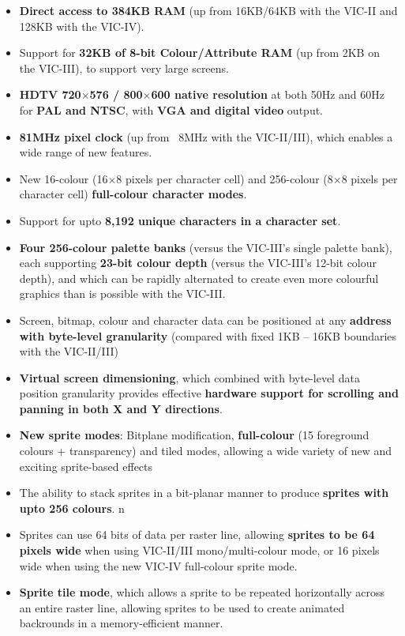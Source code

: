 \begin{itemize}
\item {\bf Direct access to 384KB RAM} (up from 16KB/64KB with the VIC-II and 128KB
  with the VIC-IV).
\item Support for {\bf 32KB of 8-bit Colour/Attribute RAM} (up from 2KB on the VIC-III), to
  support very large screens.
\item {\bf HDTV 720$\times$576 / 800$\times$600 native resolution} at both 50Hz and 60Hz for {\bf PAL and NTSC}, with {\bf VGA and digital video} output.
\item {\bf 81MHz pixel clock} (up from ~8MHz with the VIC-II/III), which enables a wide range of new features.
\item New 16-colour (16$\times$8 pixels per character cell) and 256-colour (8$\times$8 pixels per character cell) {\bf full-colour character modes}.
\item Support for upto {\bf 8,192 unique characters in a character set}.
\item {\bf Four 256-colour palette banks} (versus the VIC-III's single palette bank), each supporting {\bf 23-bit colour depth} (versus the VIC-III's 12-bit colour depth), and which can be rapidly alternated to create even more colourful graphics than is possible with the VIC-III.
\item Screen, bitmap, colour and character data can be positioned at any {\bf address with byte-level granularity} (compared with fixed 1KB -- 16KB boundaries with the VIC-II/III)
\item {\bf Virtual screen dimensioning}, which combined with byte-level data position granularity provides effective {\bf hardware support for scrolling and panning in both X and Y directions}.
\item {\bf New sprite modes}: Bitplane modification, {\bf full-colour} (15 foreground colours + transparency) and tiled modes, allowing a wide variety of new and exciting sprite-based effects
  \item The ability to stack sprites in a bit-planar manner to produce {\bf sprites with upto 256 colours}.
n\item Sprites can use 64 bits of data per raster line, allowing {\bf sprites to be 64 pixels wide} when using VIC-II/III mono/multi-colour mode, or 16 pixels wide when using the new VIC-IV full-colour sprite mode.
\item {\bf Sprite tile mode}, which allows a sprite to be repeated horizontally across an entire raster line, allowing sprites to be used to create  animated backrounds in a memory-efficient manner.

\end{itemize}
